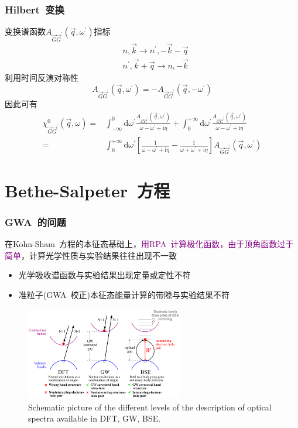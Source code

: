 \documentclass[cjk,slidestop,compress,mathserif,blue]{beamer}
\begin{document}
\frame
{
	\frametitle{\textrm{Hilbert~}变换}
	变换谱函数$A_{\vec G\vec G^{\prime}}(\vec q,\omega^{\prime})$指标
	\begin{displaymath}
		\begin{aligned}
			&n,\vec k\rightarrow n^{\prime},-\vec k-\vec q\\
			&n^{\prime},\vec k+\vec q\rightarrow n,-\vec k
		\end{aligned}
	\end{displaymath}
	利用时间反演对称性
	\begin{displaymath}
		A_{\vec G\vec G^{\prime}}(\vec q,\omega^{\prime})=-A_{\vec G\vec G^{\prime}}(\vec q,-\omega^{\prime})
	\end{displaymath}
	因此可有
	\begin{displaymath}
		\begin{aligned}
			\chi_{\vec G\vec G^{\prime}}^0(\vec q,\omega)=&\int_{-\infty}^0\mathrm{d}\omega^{\prime}\frac{A_{\vec G\vec G^{\prime}}(\vec q,\omega^{\prime})}{\omega-\omega^{\prime}+\mathrm{i}\eta}+\int_0^{+\infty}\mathrm{d}\omega^{\prime}\frac{A_{\vec G\vec G^{\prime}}(\vec q,\omega^{\prime})}{\omega-\omega^{\prime}+\mathrm{i}\eta}\\
			=&\int_0^{+\infty}\mathrm{d}\omega^{\prime}\left[ \frac1{\omega-\omega^{\prime}+\mathrm{i}\eta}-\frac1{\omega+\omega^{\prime}+\mathrm{i}\eta} \right]A_{\vec G\vec G^{\prime}}(\vec q,\omega^{\prime})
		\end{aligned}
	\end{displaymath}
}

\section{\rm{Bethe-Salpeter~}方程}
\frame
{
	\frametitle{\textrm{GWA~}的问题}
	在\textrm{Kohn-Sham~}方程的本征态基础上，\textcolor{purple}{用\textrm{RPA~}计算极化函数，由于顶角函数过于简单}，计算光学性质与实验结果往往出现不一致
	\begin{itemize}
		\item 光学吸收谱函数与实验结果出现定量或定性不符
		\item 准粒子(\textrm{GWA~}校正)本征态能量计算的带隙与实验结果不符
	\end{itemize}
\begin{figure}[h!]
\centering
\vspace*{-0.12in}
\includegraphics[height=1.6in,width=2.7in,viewport=0 0 1000 600,clip]{Figures/BSE_GW_DFT.png}
\caption{\small \textrm{Schematic picture of the different levels of the description of optical spectra available in DFT, GW, BSE.}}%
\label{DFT_GW_BSE}
\end{figure} 
}
\end{document}
